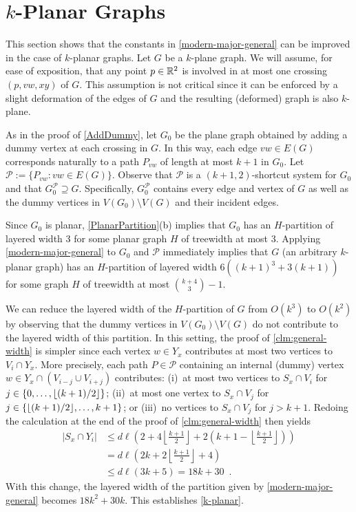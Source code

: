 \documentclass{patmorin}
\DeclarePairedDelimiter{\floor}{\lfloor}{\rfloor}
\newcommand{\PP}{\mathcal{P}}
\renewcommand{\le}{\leqslant}
\begin{document}
\section{\boldmath $k$-Planar Graphs}
\label{sec-k-planar}

This section shows that the constants in \cref{modern-major-general} can be improved in the case of $k$-planar graphs. Let $G$ be a $k$-plane graph.  We will assume, for ease of exposition, that any point $p\in\mathbb{R}^2$ is involved in at most one crossing $(p,vw,xy)$ of $G$. This assumption is not critical since it can be enforced by a slight deformation of the edges of $G$ and the resulting (deformed) graph is also $k$-plane.  

As in the proof of \cref{AddDummy}, let $G_0$ be the plane graph obtained by adding a dummy vertex at each crossing in $G$. In this way, each edge $vw\in E(G)$ corresponds naturally to a path $P_{vw}$ of length at most $k+1$ in $G_0$.  Let $\PP := \{P_{vw}: vw\in E(G)\}$. Observe that $\PP$ is a $(k+1,2)$-shortcut system for $G_0$ and that $G_0^{\mathcal{P}}\supseteq G$.  Specifically, $G_0^{\mathcal{P}}$ contains every edge and vertex of $G$ as well as the dummy vertices in $V(G_0)\setminus V(G)$ and their incident edges.  

Since $G_0$ is planar,  \cref{PlanarPartition}(b) implies that $G_0$ has an $H$-partition of layered width 3 for some planar graph $H$ of treewidth at most 3.  Applying \cref{modern-major-general} to $G_0$ and $\mathcal{P}$ immediately implies that $G$ (an arbitrary $k$-planar graph) has an $H$-partition of layered width $6((k+1)^3+3(k+1))$ for some graph $H$ of treewidth at most $\binom{k+4}{3}-1$.

We can reduce the layered width of the $H$-partition of $G$ from $O(k^3)$ to $O(k^2)$ by observing that the dummy vertices in $V(G_0)\setminus V(G)$ do not contribute to the layered width of this partition.  In this setting, the proof of \cref{clm:general-width} is simpler since each vertex $w\in Y_x$ contributes at most two vertices to $V_i\cap Y_x$.  More precisely, each path $P\in\mathcal{P}$ containing an internal (dummy) vertex $w\in Y_x\cap (V_{i-j}\cup V_{i+j})$ contributes: (i)~at most two vertices to $S_x\cap V_i$ for $j\in\{0,\ldots,\floor{(k+1)/2}\}$; (ii)~at most one vertex to $S_x\cap V_j$ for $j\in\{\floor{(k+1)/2},\ldots,k+1\}$; or (iii)~no vertices to $S_x\cap V_j$ for $j > k+1$.
Redoing the calculation at the end of the proof of \cref{clm:general-width} then yields 
\begin{align*}
    |S_x\cap Y_i| &\le d\ell\left( 
       2 
       + 4\left\lfloor\frac{k+1}{2}\right\rfloor 
       + 2\left(k+1-\left\lfloor\frac{k+1}{2}\right\rfloor\right)
       \right)\\
       & =
       d\ell\left(
         2k + 2\left\lfloor\frac{k+1}{2}\right\rfloor + 4
       \right) \\
       & \le
       d\ell(3k+5) = 18k+30 \enspace .
\end{align*}    
With this change, the layered width of the partition given by \cref{modern-major-general} becomes $18k^2+30k$.  This establishes \cref{k-planar}.
\end{document}
